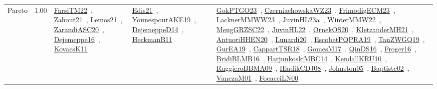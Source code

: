 {\begin{longtable}{p{3cm}r>{\raggedright\arraybackslash}p{6cm}>{\raggedright\arraybackslash}p{6cm}>{\raggedright\arraybackslash}p{8cm}}
\index{Pareto}\index{Concepts!Pareto}Pareto &  1.00 & \href{../works/FarsiTM22.pdf}{FarsiTM22}~\cite{FarsiTM22}, \href{../works/Zahout21.pdf}{Zahout21}~\cite{Zahout21}, \href{../works/Lemos21.pdf}{Lemos21}~\cite{Lemos21}, \href{../works/ZarandiASC20.pdf}{ZarandiASC20}~\cite{ZarandiASC20}, \href{../works/Dejemeppe16.pdf}{Dejemeppe16}~\cite{Dejemeppe16}, \href{../works/KovacsK11.pdf}{KovacsK11}~\cite{KovacsK11} & \href{../works/Edis21.pdf}{Edis21}~\cite{Edis21}, \href{../works/YounespourAKE19.pdf}{YounespourAKE19}~\cite{YounespourAKE19}, \href{../works/DejemeppeD14.pdf}{DejemeppeD14}~\cite{DejemeppeD14}, \href{../works/HeckmanB11.pdf}{HeckmanB11}~\cite{HeckmanB11} & \href{../works/GokPTGO23.pdf}{GokPTGO23}~\cite{GokPTGO23}, \href{../works/CzerniachowskaWZ23.pdf}{CzerniachowskaWZ23}~\cite{CzerniachowskaWZ23}, \href{../works/FrimodigECM23.pdf}{FrimodigECM23}~\cite{FrimodigECM23}, \href{../works/LacknerMMWW23.pdf}{LacknerMMWW23}~\cite{LacknerMMWW23}, \href{../works/JuvinHL23a.pdf}{JuvinHL23a}~\cite{JuvinHL23a}, \href{../works/WinterMMW22.pdf}{WinterMMW22}~\cite{WinterMMW22}, \href{../works/MengGRZSC22.pdf}{MengGRZSC22}~\cite{MengGRZSC22}, \href{../works/JuvinHL22.pdf}{JuvinHL22}~\cite{JuvinHL22}, \href{../works/OrnekOS20.pdf}{OrnekOS20}~\cite{OrnekOS20}, \href{../works/KletzanderMH21.pdf}{KletzanderMH21}~\cite{KletzanderMH21}, \href{../works/AntuoriHHEN20.pdf}{AntuoriHHEN20}~\cite{AntuoriHHEN20}, \href{../works/Lunardi20.pdf}{Lunardi20}~\cite{Lunardi20}, \href{../works/EscobetPQPRA19.pdf}{EscobetPQPRA19}~\cite{EscobetPQPRA19}, \href{../works/TanZWGQ19.pdf}{TanZWGQ19}~\cite{TanZWGQ19}, \href{../works/GurEA19.pdf}{GurEA19}~\cite{GurEA19}, \href{../works/CappartTSR18.pdf}{CappartTSR18}~\cite{CappartTSR18}, \href{../works/GomesM17.pdf}{GomesM17}~\cite{GomesM17}, \href{../works/QinDS16.pdf}{QinDS16}~\cite{QinDS16}, \href{../works/Froger16.pdf}{Froger16}~\cite{Froger16}, \href{../works/BridiBLMB16.pdf}{BridiBLMB16}~\cite{BridiBLMB16}, \href{../works/HarjunkoskiMBC14.pdf}{HarjunkoskiMBC14}~\cite{HarjunkoskiMBC14}, \href{../works/KendallKRU10.pdf}{KendallKRU10}~\cite{KendallKRU10}, \href{../works/RuggieroBBMA09.pdf}{RuggieroBBMA09}~\cite{RuggieroBBMA09}, \href{../works/HladikCDJ08.pdf}{HladikCDJ08}~\cite{HladikCDJ08}, \href{../works/Johnston05.pdf}{Johnston05}~\cite{Johnston05}, \href{../works/Baptiste02.pdf}{Baptiste02}~\cite{Baptiste02}, \href{../works/VanczaM01.pdf}{VanczaM01}~\cite{VanczaM01}, \href{../works/FocacciLN00.pdf}{FocacciLN00}~\cite{FocacciLN00}\\

\end{longtable}}

